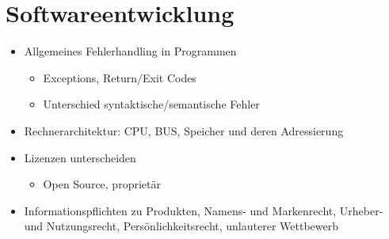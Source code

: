 \section{Softwareentwicklung}
\label{sec:Softwareentwicklung}


\begin{itemize}
	\item Allgemeines Fehlerhandling in Programmen
	\begin{itemize}
		\item Exceptions, Return/Exit Codes
		\item Unterschied syntaktische/semantische Fehler
	\end{itemize}
	\item Rechnerarchitektur: CPU, BUS, Speicher und deren Adressierung
	\item Lizenzen unterscheiden
	\begin{itemize}
		\item Open Source, proprietär
	\end{itemize}
	\item Informationspflichten zu Produkten, Namens- und Markenrecht, Urheber- und Nutzungsrecht, Persönlichkeitsrecht, unlauterer Wettbewerb
\end{itemize}







\newpage

\newpage







